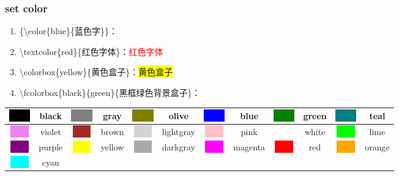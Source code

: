 
\subsubsection{set color}

\begin{enumerate}[topsep=0pt,itemsep=0pt,parsep=0pt,leftmargin=3.6em,label=\arabic*>]
    \item \{\textbackslash color\{blue\}\{蓝色字\}\}：{\color{blue}{蓝色字}}
    \item \textbackslash textcolor\{red\}\{红色字体\}：\textcolor{red}{红色字体}
    \item \textbackslash colorbox\{yellow\}\{黄色盒子\}：\colorbox{yellow}{黄色盒子}
    \vspace{-0.4em}
    \item \textbackslash fcolorbox\{black\}\{green\}\{黑框绿色背景盒子\}：
\end{enumerate}

\begin{longtable}{cp{5em}|cp{5em}|cp{5em}|cp{5em}|cp{5em}|cp{5em}}
    \hline
    \colorbox{black}{\textcolor{black}{color}} & \multicolumn{1}{c|}{black} &
    \colorbox{gray}{\textcolor{gray}{color}} & \multicolumn{1}{c|}{gray} &
    \colorbox{olive}{\textcolor{olive}{color}} & \multicolumn{1}{c|}{olive} &
    \colorbox{blue}{\textcolor{blue}{color}} & \multicolumn{1}{c|}{blue} &
    \colorbox{green}{\textcolor{green}{color}} & \multicolumn{1}{c|}{green} &
    \colorbox{teal}{\textcolor{teal}{color}} & \multicolumn{1}{c}{teal} \\
    \hline
    \colorbox{violet}{\textcolor{violet}{color}} & \multicolumn{1}{c|}{violet} &
    \colorbox{brown}{\textcolor{brown}{color}} & \multicolumn{1}{c|}{brown} &
    \colorbox{lightgray}{\textcolor{lightgray}{color}} & \multicolumn{1}{c|}{lightgray} &
    \colorbox{pink}{\textcolor{pink}{color}} & \multicolumn{1}{c|}{pink} &
    \colorbox{white}{\textcolor{white}{color}} & \multicolumn{1}{c|}{white} &
    \colorbox{lime}{\textcolor{lime}{color}} & \multicolumn{1}{c}{lime} \\
    \hline
    \colorbox{purple}{\textcolor{purple}{color}} & \multicolumn{1}{c|}{purple} &
    \colorbox{yellow}{\textcolor{yellow}{color}} & \multicolumn{1}{c|}{yellow} &
    \colorbox{darkgray}{\textcolor{darkgray}{color}} & \multicolumn{1}{c|}{darkgray} &
    \colorbox{magenta}{\textcolor{magenta}{color}} & \multicolumn{1}{c|}{magenta} &
    \colorbox{red}{\textcolor{red}{color}} & \multicolumn{1}{c|}{red} &
    \colorbox{orange}{\textcolor{orange}{color}} & \multicolumn{1}{c}{orange} \\
    \hline
    \colorbox{cyan}{\textcolor{cyan}{color}} & \multicolumn{1}{c|}{cyan} \\
    \hline
\end{longtable}

